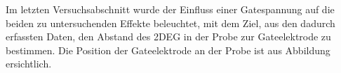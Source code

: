 
Im letzten Versuchsabschnitt wurde der Einfluss einer Gatespannung auf die beiden zu untersuchenden Effekte beleuchtet, mit dem Ziel, aus den dadurch erfassten Daten, den Abstand des 2DEG in der Probe zur Gateelektrode zu bestimmen. %
Die Position der Gateelektrode an der Probe ist aus Abbildung %
ersichtlich. 





